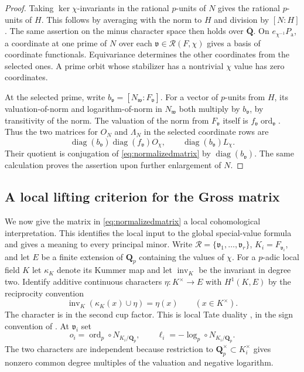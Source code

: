 \documentclass[11pt]{amsart}
\numberwithin{equation}{section}
\theoremstyle{definition}
\theoremstyle{remark}
\newcommand{\Q}{\mathbf Q}
\newcommand{\Qbar}{\overline{\mathbf Q}}
\newcommand{\ord}{\operatorname{ord}}
\begin{document}
\begin{proof}
Taking $\ker\chi$-invariants in the rational $p$-units
of $N$ gives the rational $p$-units of $H$. This follows
by averaging with the norm to $H$ and division by
$[N:H]$. The same assertion on the minus character
space then holds over $\Qbar$. On
$e_{\chi^{-1}}P_{\mathrm a}$, a coordinate at one
prime of $N$ over each $\mathfrak v\in\mathcal R(F,\chi)$
gives a basis of coordinate functionals. Equivariance
determines the other coordinates from the selected
ones. A prime orbit whose stabilizer has a nontrivial
$\chi$ value has zero coordinates.

At the selected prime, write $b_\mathfrak v=[N_\mathfrak w:
F_\mathfrak v]$. For a vector of $p$-units from $H$, its
valuation-of-norm and logarithm-of-norm in $N_\mathfrak w$
both multiply by $b_\mathfrak v$, by transitivity of the
norm. The valuation of the norm from $F_\mathfrak v$
itself is $f_\mathfrak v\ord_\mathfrak v$. Thus the two
matrices for $O_N$ and $\Lambda_N$ in the selected
coordinate rows are
\[
 \operatorname{diag}(b_\mathfrak v)
       \operatorname{diag}(f_\mathfrak v)O_\chi,
 \qquad
 \operatorname{diag}(b_\mathfrak v)L_\chi .
\]
Their quotient is conjugation of \eqref{eq:normalizedmatrix}
by $\operatorname{diag}(b_\mathfrak v)$. The same calculation
proves the assertion upon further enlargement of $N$.
\end{proof}

\subsection{A local lifting criterion for the Gross matrix}
\label{subsec:reciprocity}

We now give the matrix in \eqref{eq:normalizedmatrix} a local
cohomological interpretation. This identifies the local input to the
global special-value formula and gives a meaning to every principal
minor. Write $\mathcal R=\{\mathfrak v_1,\ldots,\mathfrak v_r\}$,
$K_i=F_{\mathfrak v_i}$, and let $E$ be a finite extension of $\Q_p$
containing the values of $\chi$. For a $p$-adic local field $K$ let
$\kappa_K$ denote its Kummer map and let $\operatorname{inv}_K$ be
the invariant in degree two. Identify additive continuous characters
$\eta:K^\times\to E$ with $H^1(K,E)$ by the reciprocity convention
\begin{equation}\label{eq:local-sign}
 \operatorname{inv}_K(\kappa_K(x)\cup\eta)=\eta(x)
 \qquad(x\in K^\times).
\end{equation}
The character is in the second cup factor. This is local Tate
duality \cite[Ch.~I, \S2]{Milne}, in the sign convention of
\cite[eq.~(2.3)]{MohajerSemistable}. At $\mathfrak v_i$ set
\[
 o_i=\ord_p\circ N_{K_i/\Q_p},\qquad
 \ell_i=-\log_p\circ N_{K_i/\Q_p}.
\]
The two characters are independent because restriction to
$\Q_p^\times\subset K_i^\times$ gives nonzero common degree
multiples of the valuation and negative logarithm.
\end{document}
